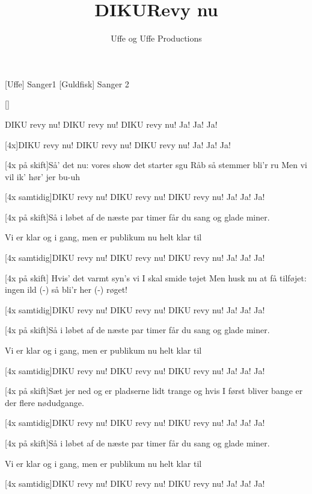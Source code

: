\documentclass[a4paper,11pt]{article}
\title{DIKURevy nu}
\author{Uffe og Uffe Productions}
\begin{document}
\maketitle

\begin{roles}
[Uffe] Sanger1
[Guldfisk] Sanger 2
\end{roles}

\begin{props}
[]
\end{props}

  
\begin{song}

DIKU revy nu!
DIKU revy nu!
DIKU revy nu!
Ja! Ja! Ja!

[4x]DIKU revy nu!
DIKU revy nu!
DIKU revy nu!
Ja! Ja! Ja!

[4x på skift]Så' det nu: vores show det starter sgu
Råb så stemmer bli'r ru
Men vi vil ik' hør' jer bu-uh

[4x samtidig]DIKU revy nu!
DIKU revy nu!
DIKU revy nu!
Ja! Ja! Ja!

[4x på skift]Så i løbet af de næste par timer
får du sang og glade miner.

Vi er klar og i gang,
men er publikum nu helt klar til

[4x samtidig]DIKU revy nu!
DIKU revy nu!
DIKU revy nu!
Ja! Ja! Ja!


[4x på skift] Hvis' det varmt syn's vi I skal smide tøjet
Men husk nu at få tilføjet:
ingen ild (-) så bli'r her (-) røget!

[4x samtidig]DIKU revy nu!
DIKU revy nu!
DIKU revy nu!
Ja! Ja! Ja!

[4x på skift]Så i løbet af de næste par timer
får du sang og glade miner.

Vi er klar og i gang,
men er publikum nu helt klar til

[4x samtidig]DIKU revy nu!
DIKU revy nu!
DIKU revy nu!
Ja! Ja! Ja!


[4x på skift]Sæt jer ned og er pladserne lidt trange
og hvis I først bliver bange
er der flere nødudgange.

[4x samtidig]DIKU revy nu!
DIKU revy nu!
DIKU revy nu!
Ja! Ja! Ja!

[4x på skift]Så i løbet af de næste par timer
får du sang og glade miner.

Vi er klar og i gang,
men er publikum nu helt klar til

[4x samtidig]DIKU revy nu!
DIKU revy nu!
DIKU revy nu!
Ja! Ja! Ja!



\end{song}
\end{document}
